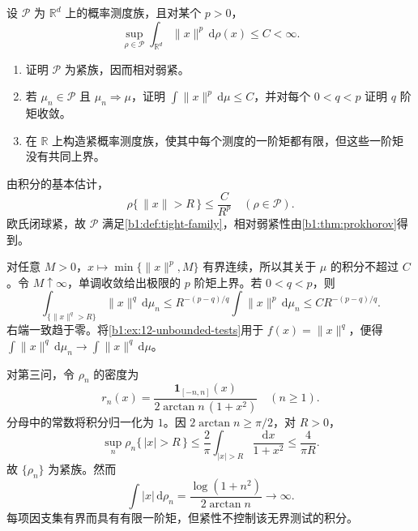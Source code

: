 \begin{exercise}\label{b1:ex:12-moment-tightness}
设 \(\mathcal P\) 为 \(\mathbb R^d\) 上的概率测度族，且对某个 \(p>0\)，
\[
 \sup_{\rho\in\mathcal P}\int_{\mathbb R^d}\|x\|^p\,\mathrm d\rho(x)\le C<\infty.
\]
\begin{enumerate}
\item\label{b1:item:12-moment-tight}
证明 \(\mathcal P\) 为紧族，因而相对弱紧。
\item\label{b1:item:12-moment-limit}
若 \(\mu_n\in\mathcal P\) 且 \(\mu_n\Rightarrow\mu\)，证明 \(\int\|x\|^p\,\mathrm d\mu\le C\)，并对每个 \(0<q<p\) 证明 \(q\) 阶矩收敛。
\item\label{b1:item:12-moment-converse}
在 \(\mathbb R\) 上构造紧概率测度族，使其中每个测度的一阶矩都有限，但这些一阶矩没有共同上界。
\end{enumerate}
\end{exercise}
\begin{solution}
由积分的基本估计，
\[
 \rho\{\,\|x\|>R\,\}\le\frac C{R^p}\quad(\rho\in\mathcal P).
\]
欧氏闭球紧，故 \(\mathcal P\) 满足\cref{b1:def:tight-family}，相对弱紧性由\cref{b1:thm:prokhorov}得到。

对任意 \(M>0\)，\(x\mapsto\min\{\|x\|^p,M\}\) 有界连续，所以其关于 \(\mu\) 的积分不超过 \(C\)。令 \(M\uparrow\infty\)，单调收敛给出极限的 \(p\) 阶矩上界。若 \(0<q<p\)，则
\[
 \int_{\{\|x\|^q>R\}}\|x\|^q\,\mathrm d\mu_n
 \le R^{-(p-q)/q}\int\|x\|^p\,\mathrm d\mu_n
 \le C R^{-(p-q)/q}.
\]
右端一致趋于零。将\cref{b1:ex:12-unbounded-tests}用于 \(f(x)=\|x\|^q\)，便得
\(\int\|x\|^q\,\mathrm d\mu_n\rightarrow\int\|x\|^q\,\mathrm d\mu\)。

对第三问，令 \(\rho_n\) 的密度为
\[
 r_n(x)=\frac{\mathbf1_{[-n,n]}(x)}{2\arctan n\,(1+x^2)}\quad(n\ge1).
\]
分母中的常数将积分归一化为 \(1\)。因 \(2\arctan n\ge\pi/2\)，对 \(R>0\)，
\[
 \sup_n\rho_n\{\,|x|>R\,\}
 \le\frac2\pi\int_{|x|>R}\frac{\mathrm dx}{1+x^2}
 \le\frac4{\pi R}.
\]
故 \(\{\rho_n\}\) 为紧族。然而
\[
 \int|x|\,\mathrm d\rho_n
 =\frac{\log(1+n^2)}{2\arctan n}\longrightarrow\infty.
\]
每项因支集有界而具有有限一阶矩，但紧性不控制该无界测试的积分。
\end{solution}

